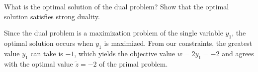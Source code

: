 What is the optimal solution of the dual problem? Show that the optimal solution satisfies strong
duality.

\begin{solution}
  Since the dual problem is a maximization problem of the single variable $y_1$, the optimal solution occurs when $y_1$
  is maximized. From our constraints, the greatest value $y_1$ can take is $-1$, which yields the objective value 
  $w = 2y_1 = -2$ and agrees with the optimal value $\tilde{z} = -2$ of the primal problem.
\end{solution}